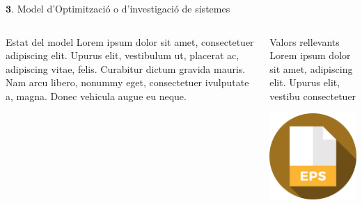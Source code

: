 \documentclass[twocolumn]{beamer}
\begin{document}
\begin{frame}{$\mathbf 3.$ Model d’Optimització o d’investigació de sistemes}
\begin{columns}[t]
	\begin{column}{.5\textwidth}
		\begin{block}{Estat del model}
			Lorem ipsum dolor sit amet,
			consectetuer adipiscing elit. Upurus elit, vestibulum ut,
			placerat ac, adipiscing vitae,
			felis. Curabitur dictum gravida
			mauris. Nam arcu libero,
			nonummy eget, consectetuer ivulputate a, magna. Donec
			vehicula augue eu neque.
		\end{block}
	\end{column}
	\begin{column}{.5\textwidth}
		\begin{block}{Valors rellevants}
			Lorem ipsum dolor sit amet,
			adipiscing elit. Upurus elit, vestibu
			consectetuer 
		\end{block}
		\includegraphics[width=3.5cm]{eps}
	\end{column}
\end{columns}
\end{frame}
\end{document}
